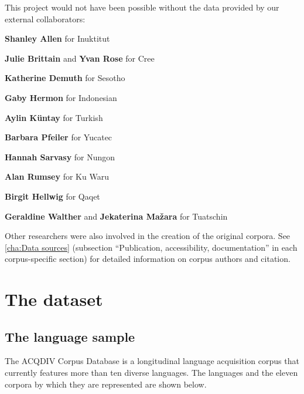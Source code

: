 \documentclass[a4paper, 11pt]{book}
\begin{document}
\noindent This project would not have been possible without the data provided by our external collaborators: 

\begin{itemize*}
	\item \textbf{Shanley Allen} for Inuktitut
	\item \textbf{Julie Brittain} and \textbf{Yvan Rose} for Cree
	\item \textbf{Katherine Demuth} for Sesotho
	\item \textbf{Gaby Hermon} for Indonesian
	\item \textbf{Aylin Küntay} for Turkish
	\item \textbf{Barbara Pfeiler} for Yucatec
	\item \textbf{Hannah Sarvasy} for Nungon
	\item \textbf{Alan Rumsey} for Ku Waru
	\item \textbf{Birgit Hellwig} for Qaqet
	\item \textbf{Geraldine Walther} and \textbf{Jekaterina Mažara} for Tuatschin
\end{itemize*}

\noindent  Other researchers were also involved in the creation of the original corpora. See \autoref{cha:Data sources} (subsection “Publication, accessibility, documentation” in each corpus-specific section) for detailed information on corpus authors and citation. 


\chapter{The dataset}
\label{cha:Overview of the dataset}

\section{The language sample}
\label{sec:The language sample}

The ACQDIV Corpus Database is a longitudinal language acquisition corpus that currently features more than ten diverse languages. The languages and the eleven corpora by which they are represented are shown below. 

\end{document}
